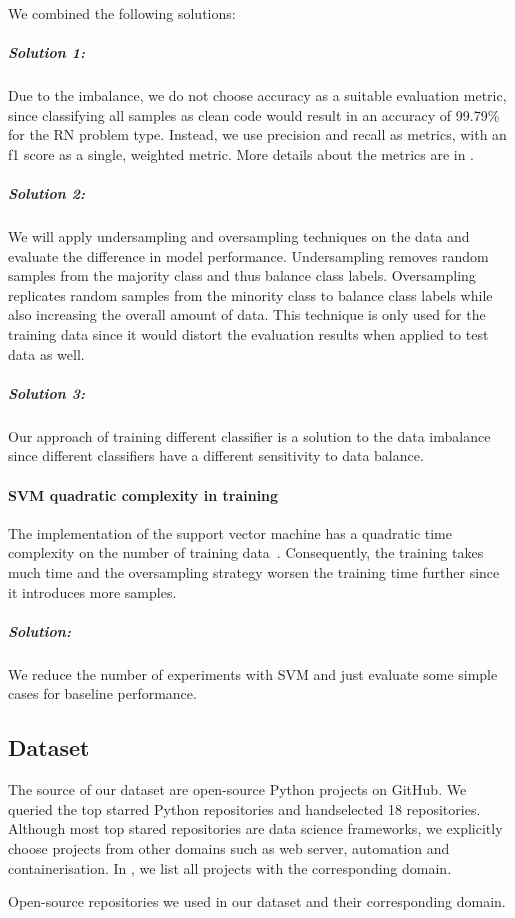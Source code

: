 We combined the following solutions:
\subparagraph{Solution 1:}
Due to the imbalance, we do not choose accuracy as a suitable evaluation metric, since classifying all samples as clean code would result in an accuracy of 99.79\% for the RN problem type. Instead, we use precision and recall as metrics, with an f1 score as a single, weighted metric. More details about the metrics are in .

\subparagraph{Solution 2:}
We will apply undersampling and oversampling techniques on the data and evaluate the difference in model performance. Undersampling removes random samples from the majority class and thus balance class labels. Oversampling replicates random samples from the minority class to balance class labels while also increasing the overall amount of data. This technique is only used for the training data since it would distort the evaluation results when applied to test data as well.

\subparagraph{Solution 3:}
Our approach of training different classifier is a solution to the data imbalance since different classifiers have a different sensitivity to data balance. 

\paragraph{SVM quadratic complexity in training}\label{sec:svm_quadratic_complexity}
The implementation of the support vector machine has a quadratic time complexity on the number of training data~\cite{abdiansah_time_2015}. Consequently, the training takes much time and the oversampling strategy worsen the training time further since it introduces more samples.
\subparagraph{Solution:}
We reduce the number of experiments with SVM and just evaluate some simple cases for baseline performance. 


\subsection{Dataset}\label{chap:clean_code_classification_dataset}
The source of our dataset are open-source Python projects on GitHub. We queried the top starred Python repositories and handselected 18 repositories. Although most top stared repositories are data science frameworks, we explicitly choose projects from other domains such as web server, automation and containerisation. In , we list all projects with the corresponding domain.
\begin{table}[h]
    \centering
    \caption{Open-source repositories we used in our dataset and their corresponding domain. }
    \label{tab:repos_domains}
\end{table}

